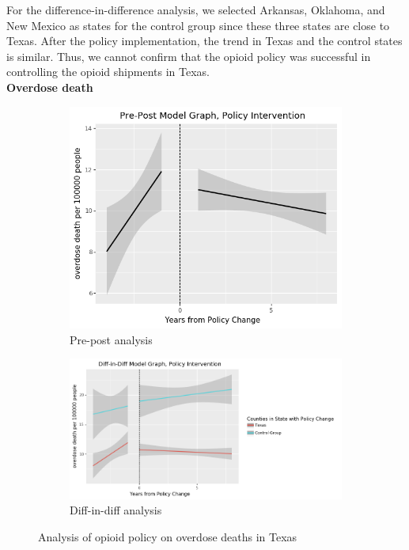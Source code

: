 \documentclass[12pt,letterpaper]{article}
\begin{document}
For the difference-in-difference analysis, we selected Arkansas, Oklahoma, and New Mexico as states for the control group since these three states are close to Texas. After the policy implementation, the trend in Texas and the control states is similar. Thus, we cannot confirm that the opioid policy was successful in controlling the opioid shipments in Texas. \\

\noindent \textbf{Overdose death}

\begin{figure}[!h]
\centering
\begin{subfigure}{.5\textwidth}
  \centering
  \includegraphics[width=0.7\linewidth]{../30_results/General_Results/texas_overdose_death_prepost.png}
  \caption{Pre-post analysis}
  \label{fig:tx_death_prepost}
\end{subfigure}%
\begin{subfigure}{.55\textwidth}
  \centering
  \includegraphics[width=1\linewidth]{../30_results/General_Results/texas_overdose_death_diffdiff.png}
  \caption{Diff-in-diff analysis}
  \label{fig:tx_death_did}
\end{subfigure}
\caption{Analysis of opioid policy on overdose deaths in Texas}
\label{fig:tx_death}
\end{figure}
\end{document}
